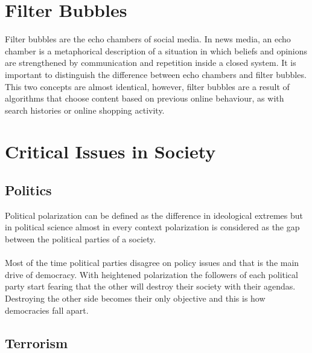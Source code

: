 \section{Filter Bubbles}

Filter bubbles are the echo chambers of social media. In news media, an echo chamber is a metaphorical description of a situation in which beliefs  and opinions are strengthened by communication and repetition inside a closed system. It is important to distinguish the difference between echo chambers and filter bubbles. This two concepts are almost identical, however,  filter bubbles are a result of algorithms that choose content based on previous online behaviour, as with search histories or online shopping activity.


\section{Critical Issues in Society}

\subsection{Politics}

Political polarization can be defined as the difference in ideological extremes but in political science almost in every context polarization is considered as the gap between the political parties of a society.
\\
\\
Most of the time political parties disagree on policy issues and that is the main drive of democracy. With heightened polarization the followers of each political party start fearing that the other will destroy their society with their agendas. Destroying the other side becomes their only objective and this is how democracies fall apart.

\subsection{Terrorism}

